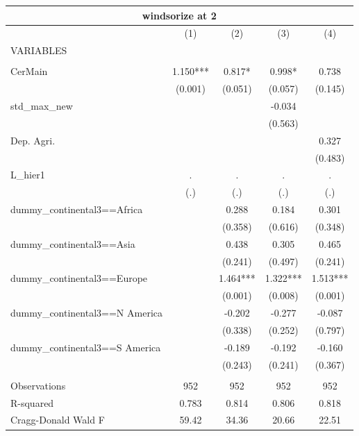 \begin{tabular}{lcccc}
\multicolumn{5}{c}{windsorize at 2} \\ \hline
 & (1) & (2) & (3) & (4) \\
VARIABLES &  &  &  &  \\ \hline
 &  &  &  &  \\
CerMain & 1.150*** & 0.817* & 0.998* & 0.738 \\
 & (0.001) & (0.051) & (0.057) & (0.145) \\
std\_max\_new &  &  & -0.034 &  \\
 &  &  & (0.563) &  \\
Dep. Agri. &  &  &  & 0.327 \\
 &  &  &  & (0.483) \\
L\_hier1 & . & . & . & . \\
 & (.) & (.) & (.) & (.) \\
dummy\_continental3==Africa &  & 0.288 & 0.184 & 0.301 \\
 &  & (0.358) & (0.616) & (0.348) \\
dummy\_continental3==Asia &  & 0.438 & 0.305 & 0.465 \\
 &  & (0.241) & (0.497) & (0.241) \\
dummy\_continental3==Europe &  & 1.464*** & 1.322*** & 1.513*** \\
 &  & (0.001) & (0.008) & (0.001) \\
dummy\_continental3==N America &  & -0.202 & -0.277 & -0.087 \\
 &  & (0.338) & (0.252) & (0.797) \\
dummy\_continental3==S America &  & -0.189 & -0.192 & -0.160 \\
 &  & (0.243) & (0.241) & (0.367) \\
 &  &  &  &  \\
Observations & 952 & 952 & 952 & 952 \\
R-squared & 0.783 & 0.814 & 0.806 & 0.818 \\
 Cragg-Donald Wald F & 59.42 & 34.36 & 20.66 & 22.51 \\ \hline
\end{tabular}
